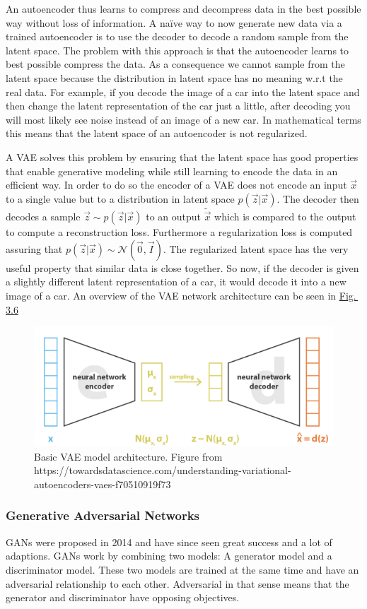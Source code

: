 An autoencoder thus learns to compress and decompress data in the best possible way without loss of information. A na\"{i}ve way to now generate new data via a trained autoencoder is to use the decoder to decode a random sample from the latent space. The problem with this approach is that the autoencoder learns to best possible compress the data. As a consequence we cannot sample from the latent space because the distribution in latent space has no meaning w.r.t the real data. For example, if you decode the image of a car into the latent space and then change the latent representation of the car just a little, after decoding you will most likely see noise instead of an image of a new car. In mathematical terms this means that the latent space of an autoencoder is not regularized.

A VAE solves this problem by ensuring that the latent space has good properties that enable generative modeling while still learning to encode the data in an efficient way. In order to do so the encoder of a VAE does not encode an input $\vec{x}$ to a single value but to a distribution in latent space $p(\vec{z}|\vec{x})$. The decoder then decodes a sample $\vec{z}\sim p(\vec{z}|\vec{x})$ to an output $\tilde{\vec{x}}$ which is compared to the output to compute a reconstruction loss. Furthermore a regularization loss is computed assuring that $p(\vec{z}|\vec{x})\sim\mathcal{N}(\vec{0},\vec{I})$. The regularized latent space has the very useful property that similar data is close together. So now, if the decoder is given a slightly different latent representation of a car, it would decode it into a new image of a car. An overview of the VAE network architecture can be seen in \hyperref[fig:3.6]{Fig.\,3.6}
%
\begin{figure} \label{fig:3.6}
    \centering
    \includegraphics[width=.65\textwidth]{Chapters/figures/vae.PNG}
    \caption[Basic VAE model architecture]{Basic VAE model architecture. Figure from\\
    https://towardsdatascience.com/understanding-variational-autoencoders-vaes-f70510919f73}
\end{figure}
%
\subsubsection{Generative Adversarial Networks} \label{sec:gans}
GANs were proposed in 2014 \cite{gan_original} and have since seen great success and a lot of adaptions. GANs work by combining two models: A generator model and a discriminator model. These two models are trained at the same time and have an adversarial relationship to each other. Adversarial in that sense means that the generator and discriminator have opposing objectives. 

